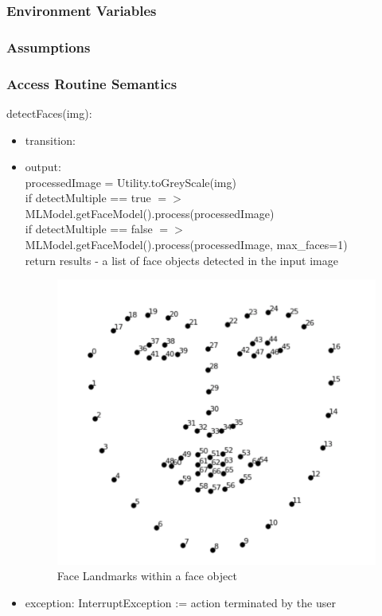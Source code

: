 \documentclass[12pt, titlepage]{article}
\begin{document}
\subsubsection{Environment Variables}

\subsubsection{Assumptions}

\subsubsection{Access Routine Semantics}
\noindent detectFaces(img):
\begin{itemize}
\item transition:
\item output: \\
processedImage = Utility.toGreyScale(img) \\
if detectMultiple == true $=>$ MLModel.getFaceModel().process(processedImage)\\
if detectMultiple == false $=>$ MLModel.getFaceModel().process(processedImage, max\_faces=1) \\
return results - a list of face objects detected in the input image
\begin{center}
\begin{figure}[H]
\includegraphics[scale=0.5]{Design/SoftDetailedDes/face_mesh.png}
\caption{Face Landmarks within a face object}
\label{Fig_UseHierarchy} 
\end{figure}
\end{center}
\item exception: InterruptException := action terminated by the user
\end{itemize}
\end{document}

